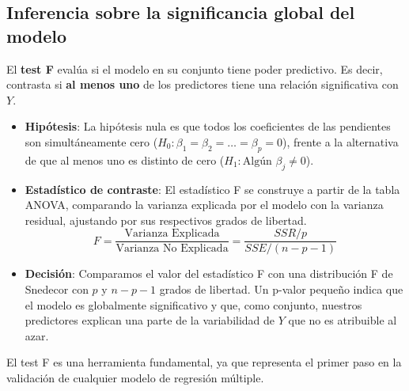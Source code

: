\documentclass[
  letterpaper,
  DIV=11,
  numbers=noendperiod]{scrreprt}
\providecommand{\tightlist}{%
  \setlength{\itemsep}{0pt}\setlength{\parskip}{0pt}}
\begin{document}
\subsection{Inferencia sobre la significancia global del
modelo}\label{inferencia-sobre-la-significancia-global-del-modelo}

El \textbf{test F} evalúa si el modelo en su conjunto tiene poder
predictivo. Es decir, contrasta si \textbf{al menos uno} de los
predictores tiene una relación significativa con \(Y\).

\begin{itemize}
\tightlist
\item
  \textbf{Hipótesis}: La hipótesis nula es que todos los coeficientes de
  las pendientes son simultáneamente cero
  (\(H_0: \beta_1 = \beta_2 = \dots = \beta_p = 0\)), frente a la
  alternativa de que al menos uno es distinto de cero
  (\(H_1: \text{Algún } \beta_j \neq 0\)).
\item
  \textbf{Estadístico de contraste}: El estadístico F se construye a
  partir de la tabla ANOVA, comparando la varianza explicada por el
  modelo con la varianza residual, ajustando por sus respectivos grados
  de libertad.
  \[F = \frac{\text{Varianza Explicada}}{\text{Varianza No Explicada}} = \frac{SSR / p}{SSE / (n-p-1)}\]
\item
  \textbf{Decisión}: Comparamos el valor del estadístico F con una
  distribución F de Snedecor con \(p\) y \(n-p-1\) grados de libertad.
  Un p-valor pequeño indica que el modelo es globalmente significativo y
  que, como conjunto, nuestros predictores explican una parte de la
  variabilidad de \(Y\) que no es atribuible al azar.
\end{itemize}

El test F es una herramienta fundamental, ya que representa el primer
paso en la validación de cualquier modelo de regresión múltiple.
\end{document}
